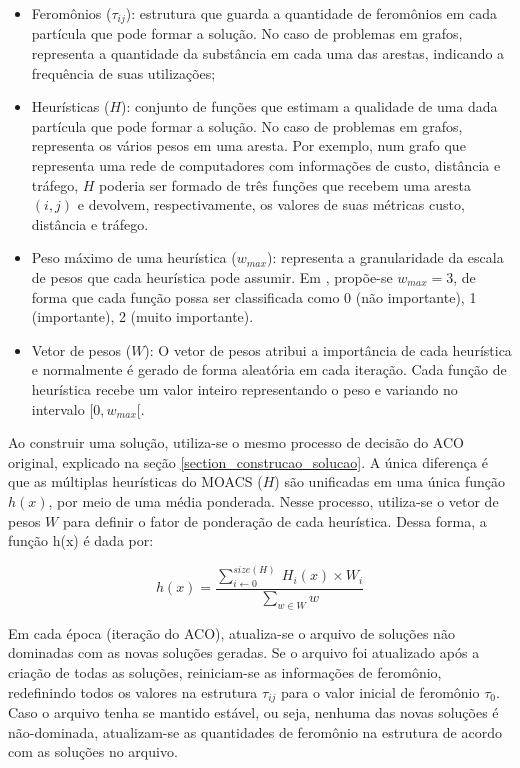 \begin{itemize}  
	\item Feromônios ($\tau_{ij}$): estrutura que guarda a quantidade de feromônios em cada partícula que pode formar a solução. No caso de problemas em grafos, representa a quantidade da substância em cada uma das arestas, indicando a frequência de suas utilizações;
	\item Heurísticas ($H$): conjunto de funções que estimam a qualidade de uma dada partícula que pode formar a solução. No caso de problemas em grafos, representa os vários pesos em uma aresta. Por exemplo, num grafo que representa uma rede de computadores com informações de custo, distância e tráfego, $H$ poderia ser formado de três funções que recebem uma aresta $(i,j)$ e devolvem, respectivamente, os valores de suas métricas custo, distância e tráfego.
	\item Peso máximo de uma heurística ($w_{max}$): representa a granularidade da escala de pesos que cada heurística pode assumir. Em \cite{Riveros2016}, propõe-se $w_{max} = 3$, de forma que cada função possa ser classificada como 0 (não importante), 1 (importante), 2 (muito importante).
	\item Vetor de pesos ($W$): O vetor de pesos atribui a importância de cada heurística e normalmente é gerado de forma aleatória em cada iteração. Cada função de heurística recebe um valor inteiro representando o peso e variando no intervalo $[0, w_{max}[$.
\end{itemize}

Ao construir uma solução, utiliza-se o mesmo processo de decisão do ACO original, explicado na seção \ref{section_construcao_solucao}. A única diferença é que as múltiplas heurísticas do MOACS ($H$) são unificadas em uma única função $h(x)$, por meio de uma média ponderada. Nesse processo, utiliza-se o vetor de pesos $W$ para definir o fator de ponderação de cada heurística. Dessa forma, a função h(x) é dada por:

\begin{equation}h(x) = \frac{\sum_{i \gets 0}^{size(H)}\ H_i(x) \times W_i}{\sum_{w \in W} w}\end{equation}

Em cada época (iteração do ACO), atualiza-se o arquivo de soluções não dominadas com as novas soluções geradas. Se o arquivo foi atualizado após a criação de todas as soluções, reiniciam-se as informações de feromônio, redefinindo todos os valores na estrutura $\tau_{ij}$ para o valor inicial de feromônio $\tau_0$. Caso o arquivo tenha se mantido estável, ou seja, nenhuma das novas soluções é não-dominada, atualizam-se as quantidades de feromônio na estrutura de acordo com as soluções no arquivo.

